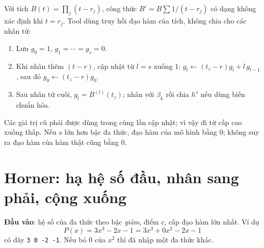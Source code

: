 Với tích $B(t)=\prod_j(t-r_j)$, công thức $B'=B\sum1/(t-r_j)$ có dạng không xác định khi $t=r_j$. Tool dùng truy hồi đạo hàm của tích, không chia cho các nhân tử:
\begin{enumerate}
\item Lưu $g_0=1$, $g_1=\cdots=g_s=0$.
\item Khi nhân thêm $(t-r)$, cập nhật từ $l=s$ xuống 1: $g_l\leftarrow(t_z-r)g_l+l\,g_{l-1}$, sau đó $g_0\leftarrow(t_z-r)g_0$.
\item Sau nhân tử cuối, $g_l=B^{(l)}(t_z)$; nhân với $\beta_k$ rồi chia $h^s$ nếu dùng biến chuẩn hóa.
\end{enumerate}
Các giá trị cũ phải được dùng trong cùng lần cập nhật; vì vậy đi từ cấp cao xuống thấp. Nếu $s$ lớn hơn bậc đa thức, đạo hàm của mô hình bằng 0; không suy ra đạo hàm của hàm thật cũng bằng 0.

\section{Horner: hạ hệ số đầu, nhân sang phải, cộng xuống}
\label{sec:horner}
\textbf{Đầu vào}: hệ số của đa thức theo bậc \emph{giảm}, điểm $c$, cấp đạo hàm lớn nhất. Ví dụ
\[
 P(x)=3x^3-2x-1=3x^3+0x^2-2x-1
\]
có dãy \texttt{3 0 -2 -1}. Nếu bỏ 0 của $x^2$ thì đã nhập một đa thức khác.

